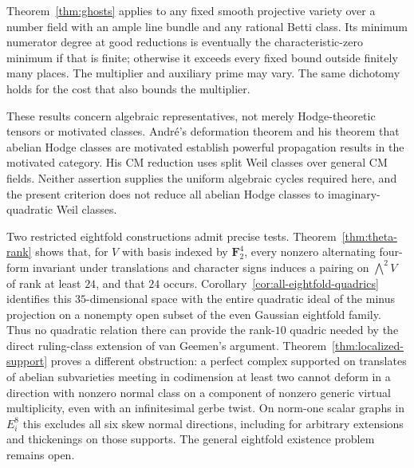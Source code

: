 Theorem~\ref{thm:ghosts} applies to any fixed smooth projective variety over a number field with an ample line bundle and any rational Betti class. Its minimum numerator degree at good reductions is eventually the characteristic-zero minimum if that is finite; otherwise it exceeds every fixed bound outside finitely many places. The multiplier and auxiliary prime may vary. The same dichotomy holds for the cost that also bounds the multiplier.

These results concern algebraic representatives, not merely Hodge-theoretic tensors or motivated classes. Andr\'e's deformation theorem and his theorem that abelian Hodge classes are motivated \cite[Theorems~0.5 and 0.6.2, pp.~8--9]{Andre96} establish powerful propagation results in the motivated category. His CM reduction \cite[Lemma~6.3.2, p.~32]{Andre96} uses split Weil classes over general CM fields. Neither assertion supplies the uniform algebraic cycles required here, and the present criterion does not reduce all abelian Hodge classes to imaginary-quadratic Weil classes.

Two restricted eightfold constructions admit precise tests. Theorem~\ref{thm:theta-rank} shows that, for $V$ with basis indexed by $\mathbf F_2^4$, every nonzero alternating four-form invariant under translations and character signs induces a pairing on $\bigwedge^2V$ of rank at least $24$, and that $24$ occurs. Corollary~\ref{cor:all-eightfold-quadrics} identifies this $35$-dimensional space with the entire quadratic ideal of the minus projection on a nonempty open subset of the even Gaussian eightfold family. Thus no quadratic relation there can provide the rank-$10$ quadric needed by the direct ruling-class extension of van Geemen's argument. Theorem~\ref{thm:localized-support} proves a different obstruction: a perfect complex supported on translates of abelian subvarieties meeting in codimension at least two cannot deform in a direction with nonzero normal class on a component of nonzero generic virtual multiplicity, even with an infinitesimal gerbe twist. On norm-one scalar graphs in $E_i^8$ this excludes all six skew normal directions, including for arbitrary extensions and thickenings on those supports. The general eightfold existence problem remains open.


